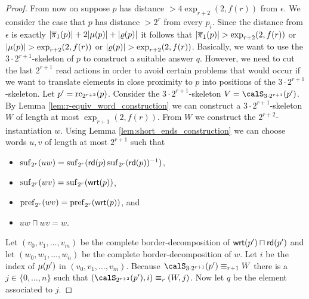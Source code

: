 \begin{proof}
	From now on suppose $p$ has distance $> 4\exp_{r+2}(2, f(r))$ from $\epsilon$.
	We consider the case that $p$ has distance $>2^r$ from every $p_i$.
	Since the distance from $\epsilon$ is exactly $|\overline{\pi}_1(p)| + 2|\mu(p)| + |\varrho(p)|$ it follows that $|\overline{\pi}_1(p)| > \exp_{r+2}(2,f(r))$ or $|\mu(p)| > \exp_{r+2}(2,f(r))$ or $|\varrho(p)| > \exp_{r+2}(2,f(r))$. 
	Basically, we want to use the $3\cdot 2^{r+1}$-skeleton of $p$ to construct a suitable answer $q$. However, we need to cut the last $2^{r+1}$ read actions in order to avoid certain problems that would occur if we want to translate elements in close proximity to $p$ into positions of the $3\cdot 2^{r+1}$-skeleton.   
	Let $p'= \operatorname{rc}_{2^{r+2}}(p)$.  Consider 
	the $3\cdot 2^{r+1}$-skeleton $V = \calS_{3\cdot 2^{r+1}}(p')$. By Lemma \ref{lem:r-equiv_word_construction} we can construct a $3\cdot 2^{r+1}$-skeleton $W$ of length at most $\exp_{r+1}(2,f(r))$. From $W$ we construct the $2^{r+2}$-instantiation $w$. Using Lemma \ref{lem:short_ends_construction} we can choose words $u,v$ of length at most 
	$2^{r+1}$ such that 
	\begin{itemize}
		\item $\operatorname{suf}_{2^{r}}(uw) = \operatorname{suf}_{2^{r}}(\mathsf{rd}(p)\operatorname{suf}_{2^{r}}(\mathsf{rd}(p))^{-1} )$,
		\item $\operatorname{suf}_{2^{r}}(wv) = \operatorname{suf}_{2^{r}}(\mathsf{wrt}(p))$,
		\item $\operatorname{pref}_{2^{r}}(wv) = \operatorname{pref}_{2^{r}}(\mathsf{wrt}(p))$, and
		\item $uw\sqcap wv = w$.
	\end{itemize}
	Let $(v_0,v_1,\ldots, v_m)$ be the complete border-decomposition of $\mathsf{wrt}(p')\sqcap \mathsf{rd}(p')$ and let $(w_0, w_1,\ldots, w_n)$ be the complete border-decomposition of $w$. Let $i$
	be the index of $\mu(p')$ in $(v_0,v_1,\ldots, v_m)$. Because $\calS_{3\cdot 2^{r+1}}(p') \equiv_{r+1} W$ there is a $j\in \{0,\ldots,n\}$ such that $(\calS_{2^{r+2}}(p'), i) \equiv_r (W,j)$.
	Now let $q$ be the element associated to $j$.
	

\end{proof}
